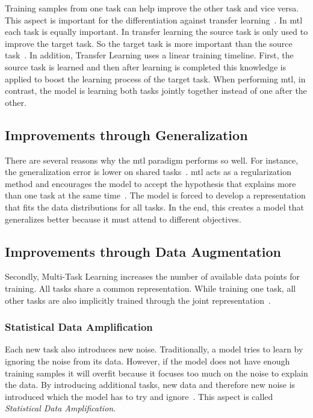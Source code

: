 Training samples from one task can help improve the other task and vice versa. This aspect is important for the differentiation against transfer learning~\cite{Pratt1993}. In \gls{mtl} each task is equally important. In transfer learning the source task is only used to improve the target task. So the target task is more important than the source task~\cite{Zhang2017a}. In addition, Transfer Learning uses a linear training timeline. First, the source task is learned and then after learning is completed this knowledge is applied to boost the learning process of the target task. When performing \gls{mtl}, in contrast, the model is learning both tasks jointly together instead of one after the other.


\subsection{Improvements through Generalization}
\label{sec:03_mtlAdvantages}

There are several reasons why the \gls{mtl} paradigm performs so well. For instance, the generalization error is lower on shared tasks~\cite{Caruana1993}. \gls{mtl} acts as a regularization method and encourages the model to accept the hypothesis that explains more than one task at the same time~\cite{Ruder2017}. The model is forced to develop a representation that fits the data distributions for all tasks. In the end, this creates a model that generalizes better because it must attend to different objectives.

\subsection{Improvements through Data Augmentation}

Secondly, Multi-Task Learning increases the number of available data points for training. All tasks share a common representation. While training one task, all other tasks are also implicitly trained through the joint representation~\cite{Caruana1993}.

\subsubsection*{Statistical Data Amplification}

Each new task also introduces new noise. Traditionally, a model tries to learn by ignoring the noise from its data. However, if the model does not have enough training samples it will overfit because it focuses too much on the noise to explain the data. By introducing additional tasks, new data and therefore new noise is introduced which the model has to try and ignore~\cite{Ruder2017}. This aspect is called \textit{Statistical Data Amplification}\cite{Caruana1995a}.

